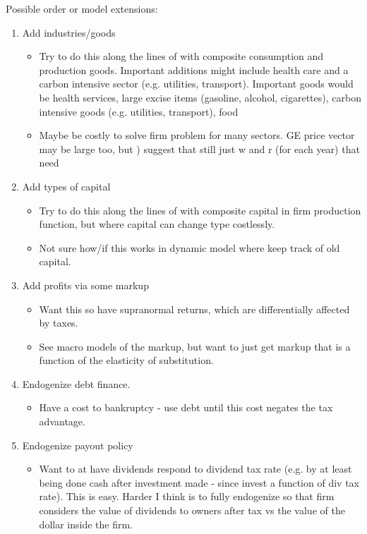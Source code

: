 Possible order or model extensions:
\begin{enumerate}
\item Add industries/goods	
	\begin{itemize}
	\item Try to do this along the lines of \citet{FG1993} with composite consumption and production goods.  Important additions might include health care and a carbon intensive sector (e.g. utilities, transport).  Important goods would be health services, large excise items (gasoline, alcohol, cigarettes), carbon intensive goods (e.g. utilities, transport), food 	
	\item Maybe be costly to solve firm problem for many sectors.  GE price vector may be large too, but \citet{FG1993}) suggest that still just w and r (for each year) that need
	\end{itemize}
\item Add types of capital	
	\begin{itemize}
	\item Try to do this along the lines of \citet{FG1993} with composite capital in firm production function, but where capital can change type costlessly.	
	\item Not sure how/if this works in dynamic model where keep track of old capital.
	\end{itemize}
\item Add profits via some markup	
	\begin{itemize}
	\item Want this so have supranormal returns, which are differentially affected by taxes. 
	\item See macro models of the markup, but want to just get markup that is a function of the elasticity of substitution.	
	\end{itemize}
\item Endogenize debt finance.
	\begin{itemize}
	\item Have a cost to bankruptcy - use debt until this cost negates the tax advantage.
	\end{itemize}	
\item Endogenize payout policy	
	\begin{itemize}
	\item Want to at have dividends respond to dividend tax rate (e.g. by at least being done cash after investment made - since invest a function of div tax rate). This is easy.  Harder I think is to fully endogenize so that firm considers the value of dividends to owners after tax vs the value of the dollar inside the firm.

\end{itemize}
\end{enumerate}
